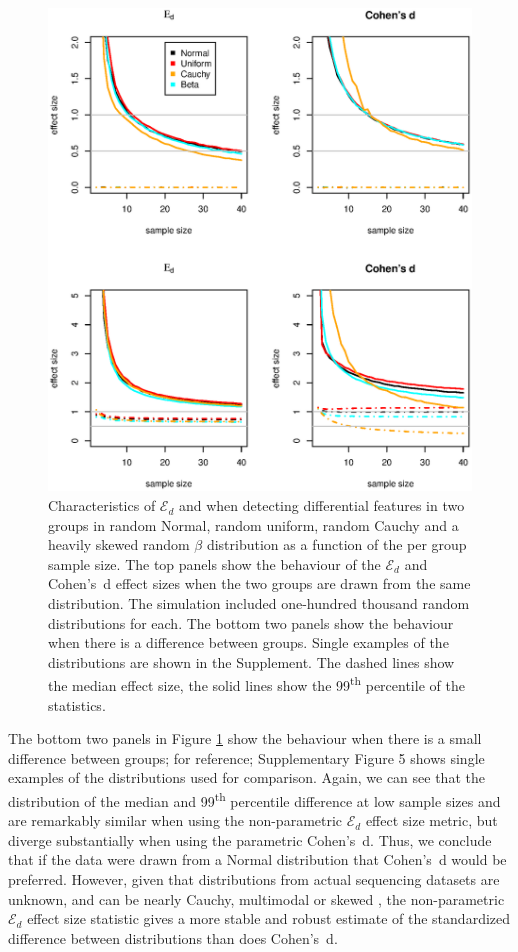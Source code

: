 \begin{figure}[tpb]
\centerline{\includegraphics[scale=0.50]{submission/F1-null-model.eps}}
\caption{Characteristics of $\mathcal{E}_{d}$ and when detecting differential features in two groups in random Normal, random uniform, random Cauchy and a heavily skewed random $\beta$ distribution as a function of the per group sample size. The top panels show the behaviour of the $\mathcal{E}_{d}$ and Cohen's~d effect sizes when the two groups are drawn from the same distribution. The simulation included one-hundred thousand random distributions for each. The bottom two panels show the behaviour when there is a difference between groups. Single examples of the distributions are shown in the Supplement. The dashed lines show the median effect size, the solid lines show the 99\textsuperscript{th} percentile of the statistics.  }
\label{fig:01}
\end{figure}

The bottom two panels in Figure \ref{fig:01} show the behaviour when there is a small difference between groups; for reference; Supplementary Figure 5 shows single examples of the distributions used  for comparison.  Again, we can see that the distribution of the median and 99\textsuperscript{th} percentile difference at low sample sizes and are remarkably similar when using the  non-parametric $\mathcal{E}_{d}$ effect size metric, but diverge substantially when using the parametric Cohen's~d. Thus, we conclude that if the data were drawn from a Normal distribution that Cohen's~d would be preferred. However, given that distributions from actual sequencing datasets are unknown, and can be nearly Cauchy, multimodal or skewed \citep{fernandes:2013},  the non-parametric $\mathcal{E}_{d}$ effect size statistic gives a more stable and robust estimate of the standardized difference between distributions than does Cohen's~d.

